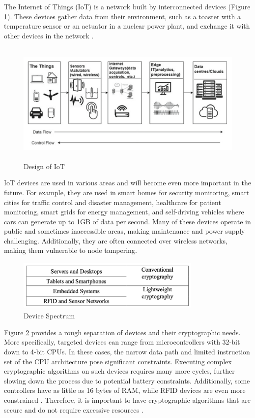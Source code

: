\documentclass[a4paper,11pt, twoside]{article}
\begin{document}
The Internet of Things (IoT) is a network built by interconnected devices (Figure \ref{fig:IoT}). These devices gather data from their environment, such as a toaster with a temperature sensor or an actuator in a nuclear power plant, and exchange it with other devices in the network \cite{chauhan2022analysis}.

\begin{figure}[h]
    \centering
    \includegraphics[width=14.0cm, height=6.0cm]{media/DesignofInternetofThings(IoT).png}
    \caption{Design of IoT}
    \label{fig:IoT}
\end{figure}

IoT devices are used in various areas and will become even more important in the future. For example, they are used in smart homes for security monitoring, smart cities for traffic control and disaster management, healthcare for patient monitoring, smart grids for energy management, and self-driving vehicles where cars can generate up to 1GB of data per second. Many of these devices operate in public and sometimes inaccessible areas, making maintenance and power supply challenging. Additionally, they are often connected over wireless networks, making them vulnerable to node tampering.

\begin{figure}[h]
    \centering
    \includegraphics[width=9.0cm, height=2.5cm]{media/device_spectrum.png}
    \caption{Device Spectrum}
    \label{fig:device_spectrum}
\end{figure}

Figure \ref{fig:device_spectrum} provides a rough separation of devices and their cryptographic needs. More specifically, targeted devices can range from microcontrollers with 32-bit down to 4-bit CPUs. In these cases, the narrow data path and limited instruction set of the CPU architecture pose significant constraints. Executing complex cryptographic algorithms on such devices requires many more cycles, further slowing down the process due to potential battery constraints. Additionally, some controllers have as little as 16 bytes of RAM, while RFID devices are even more constrained \cite{mckay2016report}. Therefore, it is important to have cryptographic algorithms that are secure and do not require excessive resources \cite{IOTMarkets} \cite{dhanda2020lightweight}.
\end{document}

